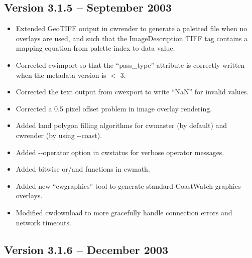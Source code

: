 
\subsection*{Version 3.1.5 -- September 2003}

\begin{itemize}

  \item Extended GeoTIFF output in cwrender to generate a paletted
  file when no overlays are used, and such that the ImageDescription
  TIFF tag contains a mapping equation from palette index to data
  value.

  \item Corrected cwimport so that the ``pass\_type'' attribute is
  correctly written when the metadata version is $<$ 3.

  \item Corrected the text output from cwexport to write ``NaN'' for
  invalid values.

  \item Corrected a 0.5 pixel offset problem in image overlay
  rendering.

  \item Added land polygon filling algorithms for cwmaster (by
  default) and cwrender (by using -{-}coast).

  \item Added -{-}operator option in cwstatus for verbose operator
  messages.

  \item Added bitwise or/and functions in cwmath.

  \item Added new ``cwgraphics'' tool to generate standard CoastWatch
  graphics overlays.

  \item Modified cwdownload to more gracefully handle connection
  errors and network timeouts.

\end{itemize}


\subsection*{Version 3.1.6 -- December 2003}

